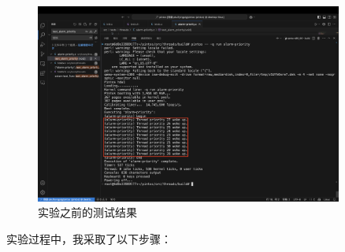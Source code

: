 \documentclass{article}
\begin{document}
\begin{figure}[H]
	\centering
	\includegraphics[width=0.9\textwidth]{img/run_origin.png}
	\caption{实验之前的测试结果}
\end{figure}

实验过程中，我采取了以下步骤：
\end{document}
